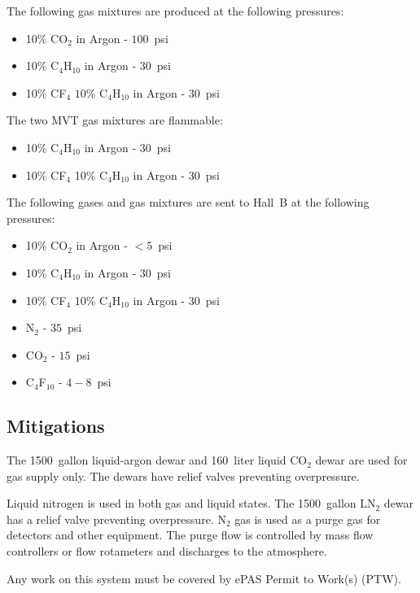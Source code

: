 The following gas mixtures are produced at the following pressures:

\begin{itemize}
\item 10\% CO$_2$ in Argon - $100$~psi
\item 10\% C$_4$H$_{10}$ in Argon - $30$~psi
\item 10\% CF$_4$ $10\%$ C$_4$H$_{10}$ in Argon - $30$~psi
\end{itemize}

The two MVT gas mixtures are flammable:

\begin{itemize}
\item 10\% C$_4$H$_{10}$ in Argon - $30$~psi
\item 10\% CF$_4$ 10\% C$_4$H$_{10}$ in Argon - $30$~psi
\end{itemize}

The following gases and gas mixtures are sent to Hall~B at the following pressures:

\begin{itemize}
\item 10\% CO$_2$ in Argon - $<5$~psi
\item 10\% C$_4$H$_{10}$ in Argon - $30$~psi
\item 10\% CF$_4$ 10\% C$_4$H$_{10}$ in Argon - $30$~psi
\item N$_2$ - $35$~psi
\item CO$_2$ - $15$~psi
\item C$_4$F$_{10}$ - $4 - 8$~psi
\end{itemize}

\subsection{Mitigations}

The 1500~gallon liquid-argon dewar and 160~liter liquid CO$_2$ dewar are used for gas supply 
only. The dewars have relief valves preventing overpressure.

Liquid nitrogen is used in both gas and liquid states. The 1500~gallon LN$_2$ dewar has a 
relief valve preventing overpressure.  
N$_2$ gas is used as a purge gas for detectors and other equipment. The purge flow is 
controlled by mass flow controllers or flow rotameters and discharges to the atmosphere.

Any work on this system must be covered by ePAS Permit to Work(s) (PTW).

